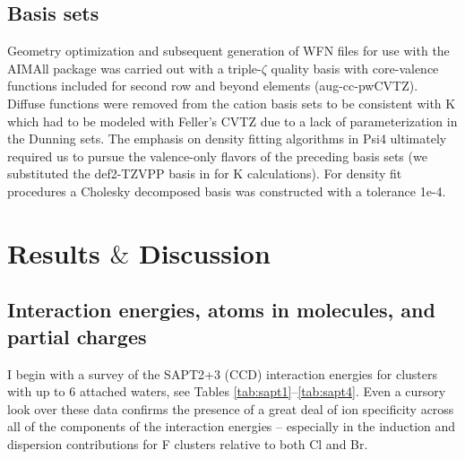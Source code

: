 \begin{sie}
   \subsection{\label{ch3:sec1:level5}Basis sets}
    Geometry optimization and subsequent generation of WFN files for use with the AIMAll package was carried out with a triple-$\zeta$ quality 
    basis with core-valence functions included for second row and beyond elements 
    (aug-cc-pwCVTZ)\cite{dunning1989h,peterson2002ofcl,peterson2007br,peterson2011lina}. Diffuse functions were removed from the 
    cation basis sets to be consistent with K\sur{+} which had to be modeled with Feller's CVTZ\cite{feller1995k} due to a lack of parameterization 
    in the Dunning sets. The emphasis on density fitting algorithms in Psi4 ultimately required us to pursue the valence-only flavors of the preceding
    basis sets (we substituted the def2-TZVPP basis in for K\sur{+} calculations\cite{rappoport2010def2,rappoport2015kri}). For density fit procedures 
    a Cholesky decomposed basis was constructed with a tolerance 1e-4.
    
  \section{\label{ch3:sec2:level1}Results $\&$ Discussion}
  \subsection{\label{ch3:sec2:level1:chasm1}Interaction energies, atoms in molecules, and partial charges}
  I begin with a survey of the SAPT2+3 (CCD) interaction energies for clusters with up to 6 attached waters, see  Tables \ref{tab:sapt1}--\ref{tab:sapt4}. 
  Even a cursory look over these data confirms the presence of a great deal of ion specificity across all of the components of the interaction energies 
  -- especially in the induction and dispersion contributions for F\sur{-} clusters relative to both Cl\sur{-} and Br\sur{-}.


\end{sie}
